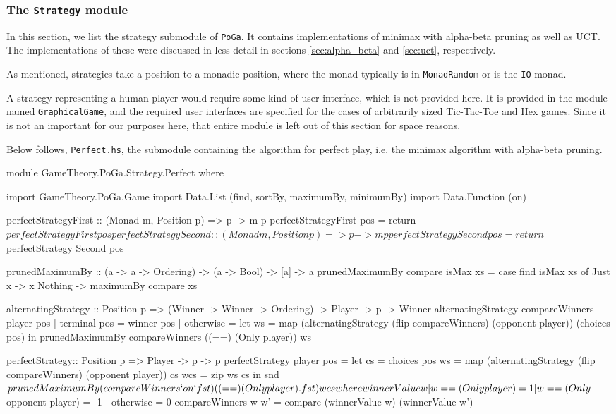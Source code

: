 \subsubsection {The \texttt{Strategy} module}

In this section, we list the strategy submodule of \texttt{PoGa}.
It contains implementations of minimax with alpha-beta pruning as well as UCT.
The implementations of these were discussed in less detail in sections \ref{sec:alpha_beta} and \ref{sec:uct}, respectively.

As mentioned, strategies take a position to a monadic position, where the monad typically is in \texttt{MonadRandom} or is the \texttt{IO} monad.

A strategy representing a human player would require some kind of user interface, which is not provided here.
It is provided in the module named \texttt{GraphicalGame}, and the required user interfaces are specified for the cases of arbitrarily sized Tic-Tac-Toe and Hex games.
Since it is not an important for our purposes here, that entire module is left out of this section for space reasons.

Below follows, \texttt{Perfect.hs}, the submodule containing the algorithm for perfect play, i.e. the minimax algorithm with alpha-beta pruning.

\begin{code}
module GameTheory.PoGa.Strategy.Perfect where

import GameTheory.PoGa.Game
import Data.List (find, sortBy, maximumBy, minimumBy)
import Data.Function (on)

perfectStrategyFirst :: (Monad m, Position p) => p -> m p
perfectStrategyFirst pos = return $ perfectStrategy First pos
perfectStrategySecond :: (Monad m, Position p) => p -> m p
perfectStrategySecond pos = return $ perfectStrategy Second pos

prunedMaximumBy :: (a -> a -> Ordering) -> (a -> Bool) -> [a] -> a
prunedMaximumBy compare isMax xs = 
  case find isMax xs of
    Just x -> x
    Nothing -> maximumBy compare xs

alternatingStrategy :: Position p =>
                       (Winner -> Winner -> Ordering) ->
                       Player -> p -> Winner
alternatingStrategy compareWinners player pos
  | terminal pos = winner pos
  | otherwise =
      let ws = map (alternatingStrategy
                    (flip compareWinners)
                    (opponent player)) (choices pos) in
      prunedMaximumBy compareWinners ((==) (Only player)) ws
    
perfectStrategy:: Position p => Player -> p -> p
perfectStrategy player pos = 
  let cs = choices pos
      ws = map (alternatingStrategy
                (flip compareWinners)
                (opponent player)) cs
      wcs = zip ws cs in
  snd $ prunedMaximumBy (compareWinners `on` fst) ((==) (Only player) . fst) wcs
  where
    winnerValue w
      | w == (Only player) = 1 
      | w == (Only $ opponent player) = -1 
      | otherwise = 0
    compareWinners w w' = compare (winnerValue w) (winnerValue w')
\end{code}

